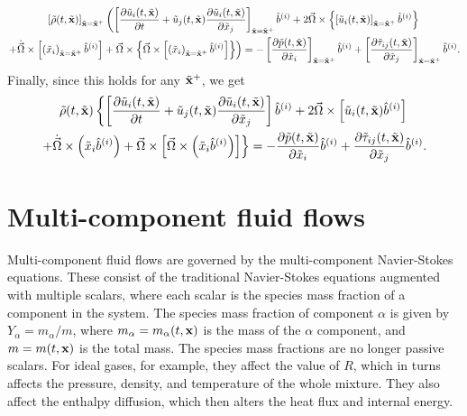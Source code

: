 \documentclass[oneside,a4paper,11pt]{report}
\begin{document}
\begin{multline}
    \left [ \tilde{\rho}(t,\tilde{\mathbf{x}}) \right]_{\tilde{\mathbf{x}} = \tilde{\mathbf{x}}^+} \left ( \left [ \frac{\partial \tilde{u}_i(t,\tilde{\mathbf{x}})}{\partial t} + \tilde{u}_j(t,\tilde{\mathbf{x}}) \frac{\partial \tilde{u}_i(t,\tilde{\mathbf{x}})}{\partial \tilde{x}_j} \right ]_{\tilde{\mathbf{x}} = \tilde{\mathbf{x}}^+} \hat{b}^{(i)} + 2 \vec{\Omega} \times \left \{ \left [\tilde{u}_i(t,\tilde{\mathbf{x}}) \right ]_{\tilde{\mathbf{x}} = \tilde{\mathbf{x}}^+} \hat{b}^{(i)} \right \} \right . \\
    \left . + \dot{\vec{\Omega}} \times \left [ \left ( \tilde{x}_i \right)_{\tilde{\mathbf{x}} = \tilde{\mathbf{x}}^+} \hat{b}^{(i)}\right ] + \vec{\Omega} \times \left \{ \vec{\Omega} \times \left [ \left ( \tilde{x}_i \right )_{\tilde{\mathbf{x}} = \tilde{\mathbf{x}}^+} \hat{b}^{(i)}\right ] \right \} \right ) = -\left [ \frac{\partial \tilde{p}(t,\tilde{\mathbf{x}})}{\partial \tilde{x}_i} \right]_{\tilde{\mathbf{x}} = \tilde{\mathbf{x}}^+} \hat{b}^{(i)} + \left [ \frac{\partial \tilde{\tau}_{ij}(t,\tilde{\mathbf{x}})}{\partial \tilde{x}_j} \right ]_{\tilde{\mathbf{x}} = \tilde{\mathbf{x}}^+} \hat{b}^{(i)}.
\end{multline}
Finally, since this holds for any $\tilde{\mathbf{x}}^+$, we get
\begin{multline}
    \tilde{\rho}(t,\tilde{\mathbf{x}}) \left \{ \left [ \frac{\partial \tilde{u}_i(t,\tilde{\mathbf{x}})}{\partial t} + \tilde{u}_j(t,\tilde{\mathbf{x}}) \frac{\partial \tilde{u}_i(t,\tilde{\mathbf{x}})}{\partial \tilde{x}_j} \right ] \hat{b}^{(i)} + 2 \vec{\Omega} \times \left [ \tilde{u}_i(t,\tilde{\mathbf{x}}) \hat{b}^{(i)} \right ] \right . \\
    \left . + \dot{\vec{\Omega}} \times \left ( \tilde{x}_i \hat{b}^{(i)}\right ) + \vec{\Omega} \times \left [ \vec{\Omega} \times \left ( \tilde{x}_i \hat{b}^{(i)} \right ) \right ] \right \} = -\frac{\partial \tilde{p}(t,\tilde{\mathbf{x}})}{\partial \tilde{x}_i} \hat{b}^{(i)} + \frac{\partial \tilde{\tau}_{ij}(t,\tilde{\mathbf{x}})}{\partial \tilde{x}_j} \hat{b}^{(i)}.
\end{multline}

\chapter{Multi-component fluid flows}
Multi-component fluid flows are governed by the multi-component Navier-Stokes equations. These consist of the traditional Navier-Stokes equations augmented with multiple scalars, where each scalar is the species mass fraction of a component in the system. The species mass fraction of component $\alpha$ is given by $Y_\alpha = m_\alpha/m$, where $m_\alpha = m_\alpha(t,\mathbf{x})$ is the mass of the $\alpha$ component, and $m = m(t,\mathbf{x})$ is the total mass. The species mass fractions are no longer passive scalars. For ideal gases, for example, they affect the value of $R$, which in turns affects the pressure, density, and temperature of the whole mixture. They also affect the enthalpy diffusion, which then alters the heat flux and internal energy. 
\end{document}
